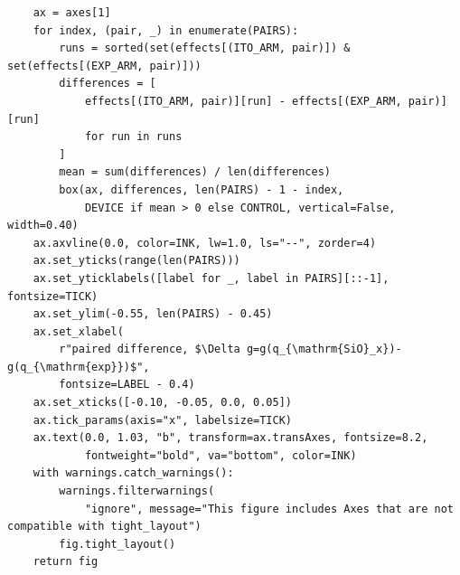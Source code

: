 \documentclass[a4paper,10pt]{article}
\begin{document}
\begin{Verbatim}
    ax = axes[1]
    for index, (pair, _) in enumerate(PAIRS):
        runs = sorted(set(effects[(ITO_ARM, pair)]) & set(effects[(EXP_ARM, pair)]))
        differences = [
            effects[(ITO_ARM, pair)][run] - effects[(EXP_ARM, pair)][run]
            for run in runs
        ]
        mean = sum(differences) / len(differences)
        box(ax, differences, len(PAIRS) - 1 - index,
            DEVICE if mean > 0 else CONTROL, vertical=False, width=0.40)
    ax.axvline(0.0, color=INK, lw=1.0, ls="--", zorder=4)
    ax.set_yticks(range(len(PAIRS)))
    ax.set_yticklabels([label for _, label in PAIRS][::-1], fontsize=TICK)
    ax.set_ylim(-0.55, len(PAIRS) - 0.45)
    ax.set_xlabel(
        r"paired difference, $\Delta g=g(q_{\mathrm{SiO}_x})-g(q_{\mathrm{exp}})$",
        fontsize=LABEL - 0.4)
    ax.set_xticks([-0.10, -0.05, 0.0, 0.05])
    ax.tick_params(axis="x", labelsize=TICK)
    ax.text(0.0, 1.03, "b", transform=ax.transAxes, fontsize=8.2,
            fontweight="bold", va="bottom", color=INK)
    with warnings.catch_warnings():
        warnings.filterwarnings(
            "ignore", message="This figure includes Axes that are not compatible with tight_layout")
        fig.tight_layout()
    return fig
\end{Verbatim}
\end{document}
